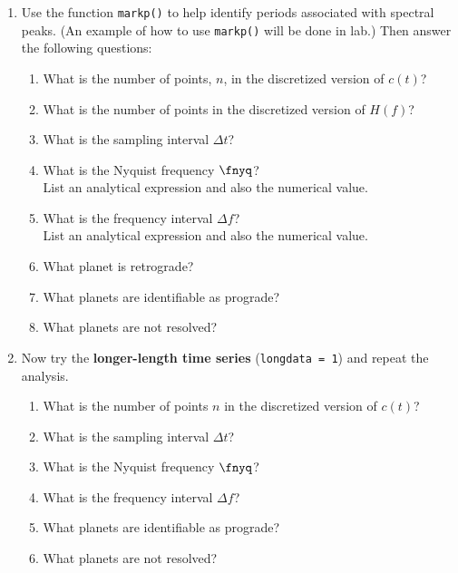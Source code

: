 \documentclass[11pt,titlepage,fleqn]{article}
\begin{document}
\begin{spacing}{2.0}
\begin{enumerate}

\item  Use the function \verb+markp()+ to help identify periods associated with spectral peaks. (An example of how to use \verb+markp()+ will be done in lab.) Then answer the following questions:
%
\begin{enumerate}
\item What is the number of points, $n$, in the discretized version of $c(t)$?
\item What is the number of points in the discretized version of $H(f)$?
\item What is the sampling interval $\Delta t$?
\item What is the Nyquist frequency $\fnyq$? \\
List an analytical expression and also the numerical value.
\item What is the frequency interval $\Delta f$? \\
List an analytical expression and also the numerical value.
\item What planet is retrograde?
\item What planets are identifiable as prograde?
\item What planets are not resolved?
\end{enumerate}

\item Now try the {\bf longer-length time series} (\verb+longdata = 1+) and repeat the analysis.
%
\begin{enumerate}
\item What is the number of points $n$ in the discretized version of $c(t)$?
\item What is the sampling interval $\Delta t$?
\item What is the Nyquist frequency $\fnyq$?
\item What is the frequency interval $\Delta f$?
\item What planets are identifiable as prograde?
\item What planets are not resolved?
\end{enumerate}

\end{enumerate}

\end{spacing}

%

\end{document}
